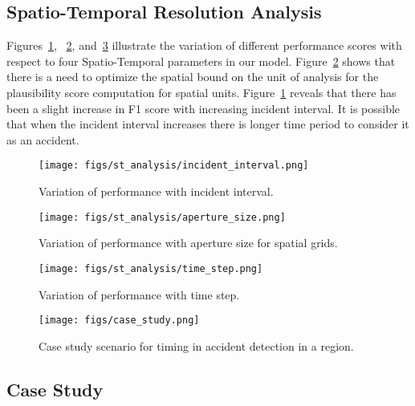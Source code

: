 \documentclass[conference]{IEEEtran}
\begin{document}
\subsection{Spatio-Temporal Resolution Analysis}
\label{sec:results_st_analysis}

Figures~\ref{fig:incident_interval}, ~\ref{fig:aperture_size}, and~\ref{fig:time_step} 
illustrate the variation of different performance scores with respect to four Spatio-Temporal parameters in our model. 
Figure~\ref{fig:aperture_size} shows that there is a need to optimize the spatial bound on the unit of analysis for the plausibility score computation for spatial units.  
Figure~\ref{fig:incident_interval} reveals that there has been a slight increase in F1 score with increasing incident interval. It is possible that when the incident interval increases there is longer time period to consider it as an accident. 



\begin{figure}[ht!]
\centering
\texttt{[image: figs/st\_analysis/incident\_interval.png]}
\caption{Variation of performance with incident interval.} \label{fig:incident_interval}
\end{figure}

\begin{figure}[ht!]
\centering
\texttt{[image: figs/st\_analysis/aperture\_size.png]}
\caption{Variation of performance with aperture size for spatial grids.} \label{fig:aperture_size}
\end{figure}

\begin{figure}[]
\centering
\texttt{[image: figs/st\_analysis/time\_step.png]}
\caption{Variation of performance with time step.}\label{fig:time_step}
\end{figure}


\vspace{-0.2in}
\begin{figure}[ht!]
\centering
\texttt{[image: figs/case\_study.png]}
\caption{Case study scenario for timing in accident detection in a region.} \label{fig:case_study}
\vspace{-0.2in}
\end{figure}

\subsection{Case Study} 
\label{sec:results_case_study}
\end{document}
